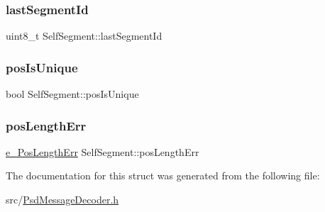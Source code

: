 \mbox{\label{struct_self_segment_a288eff27cbe3c5986dbdacfd12141675}} 
\subsubsection{\texorpdfstring{last\+Segment\+Id}{lastSegmentId}}
{\footnotesize\ttfamily uint8\+\_\+t Self\+Segment\+::last\+Segment\+Id}

\mbox{\label{struct_self_segment_adc13c811ad05f192237b55be4c2468bd}} 
\subsubsection{\texorpdfstring{pos\+Is\+Unique}{posIsUnique}}
{\footnotesize\ttfamily bool Self\+Segment\+::pos\+Is\+Unique}

\mbox{\label{struct_self_segment_a3fb749f98032e0f439c64722cdcc7cea}} 
\subsubsection{\texorpdfstring{pos\+Length\+Err}{posLengthErr}}
{\footnotesize\ttfamily \hyperlink{_psd_message_decoder_8h_a954d216bca8cdfc325504c05bb6c4336}{e\+\_\+\+Pos\+Length\+Err} Self\+Segment\+::pos\+Length\+Err}



The documentation for this struct was generated from the following file\+:\begin{DoxyCompactItemize}
\item 
src/\hyperlink{_psd_message_decoder_8h}{Psd\+Message\+Decoder.\+h}\end{DoxyCompactItemize}
